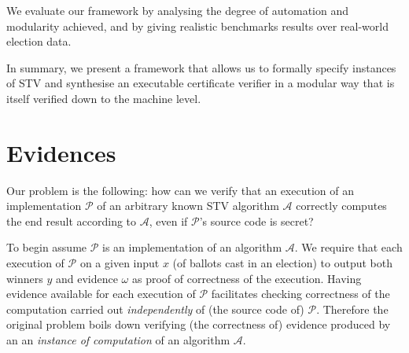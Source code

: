 \documentclass[10pt,conference]{IEEEtran}
\begin{document}

We evaluate our framework by analysing the degree of automation and modularity achieved, and by giving realistic benchmarks results over real-world election data.

In summary, we present a framework that allows us to formally specify instances of STV and synthesise an executable certificate verifier in a modular way that is itself verified down to the machine level.
\section{Evidences}
\label{sec:DataEv}
  
Our problem is the following: 
how can we verify that an execution of an implementation $\mathcal{P}$ 
of an arbitrary  known STV algorithm $\mathcal{A}$ correctly
computes the end result according to  $\mathcal{A}$, even if
$\mathcal{P}$'s source code is secret?



To begin 
assume $\mathcal{P}$ is an implementation of an algorithm
$\mathcal{A}$. We require that each execution of $\mathcal{P}$ on a
given input $x$ (of ballots cast in an election) to output both
winners $y$ and evidence $\omega$ as proof of correctness of the execution.  
 Having evidence available for each execution of $\mathcal{P}$
 facilitates checking correctness of the computation carried out
 \emph{independently} of (the source code of) $\mathcal{P}$.
 Therefore the original problem boils down verifying (the
 correctness of) evidence produced by an an
 \emph{instance of computation} of an algorithm $\mathcal{A}$.
\end{document}
